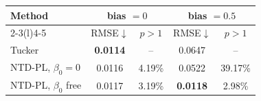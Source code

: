 \begin{tabular}{@{}l cc cc@{}}
\toprule
\multirow{2}{*}{Method} &
\multicolumn{2}{c}{bias \(=0\)} &
\multicolumn{2}{c}{bias \(=0.5\)} \\
\cmidrule(lr){2-3}\cmidrule(l){4-5}
& RMSE$\downarrow$ & \(p>1\) &
  RMSE$\downarrow$ & \(p>1\) \\
\midrule
Tucker & \textbf{0.0114} & -- &
0.0647 & -- \\
NTD-PL, \(\beta_0=0\) & 0.0116 & 4.19\% &
0.0522 & 39.17\% \\
NTD-PL, \(\beta_0\) free & 0.0117 & 3.19\% &
\textbf{0.0118} & 2.98\% \\
\bottomrule
\end{tabular}
